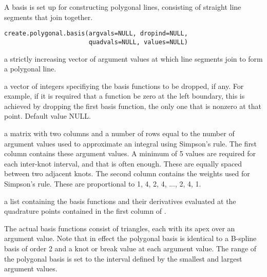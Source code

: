 \begin{Description}\relax
A basis is set up for constructing polygonal lines, consisting of 
straight line segments that join together.
\end{Description}
\begin{Usage}
\begin{verbatim}
create.polygonal.basis(argvals=NULL, dropind=NULL,
                       quadvals=NULL, values=NULL)
\end{verbatim}
\end{Usage}
\begin{Arguments}
\begin{ldescription}
\item[\code{argvals}] a strictly increasing vector of argument values at which line
segments join to form a polygonal line.

\item[\code{dropind}] a vector of integers specifiying the basis functions to
be dropped, if any.  For example, if it is required that
a function be zero at the left boundary, this is achieved
by dropping the first basis function, the only one that
is nonzero at that point. Default value NULL.

\item[\code{quadvals}] a matrix with two columns and a number of rows equal to the number
of argument values used to approximate an integral using Simpson's
rule.  The first column contains these argument values.  
A minimum of 5 values are required for
each inter-knot interval, and that is often enough. These
are equally spaced between two adjacent knots.
The second column contains the weights used for Simpson's
rule.  These are proportional to 1, 4, 2, 4, ..., 2, 4, 1.

\item[\code{values}] a list containing the basis functions and their derivatives
evaluated at the quadrature points contained in the first
column of .

\end{ldescription}
\end{Arguments}
\begin{Details}\relax
The actual basis functions consist of triangles, each with its apex
over an argument value. Note that in effect the polygonal basis is
identical to a B-spline basis of order 2 and a knot or break value at
each argument value.  The range of the polygonal basis is set to the
interval defined by the smallest and largest argument values.
\end{Details}
